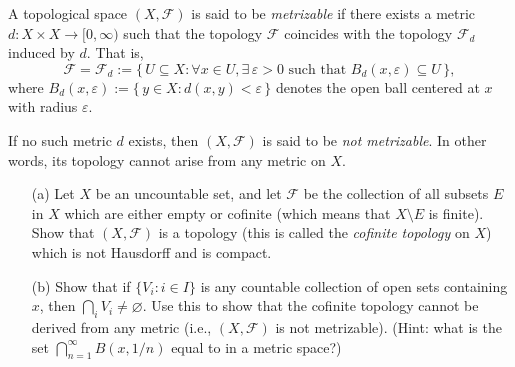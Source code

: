 \begin{problem}[15pts]
    \vphantom{text}
    \begin{definition}\label{def:metrizable}
A topological space $(X,\mathcal{F})$ is said to be \emph{metrizable} if there exists a metric $d : X \times X \to [0,\infty)$ such that the topology $\mathcal{F}$ coincides with the topology $\mathcal{F}_d$ induced by $d$.  
That is,
\[
\mathcal{F} = \mathcal{F}_d := \{\, U \subseteq X : \forall x \in U, \exists\, \varepsilon > 0 \text{ such that } B_d(x,\varepsilon) \subseteq U \,\},
\]
where $B_d(x,\varepsilon) := \{\, y \in X : d(x,y) < \varepsilon \,\}$ denotes the open ball centered at $x$ with radius $\varepsilon$.

\medskip
If no such metric $d$ exists, then $(X,\mathcal{F})$ is said to be \emph{not metrizable}.  
In other words, its topology cannot arise from any metric on $X$.
\end{definition}

\begin{enumerate}
\item[(a)]  Let $X$ be an uncountable set, and let $\mathcal{F}$ be the collection of all subsets $E$ in $X$ which are either empty or cofinite (which means that $X \setminus E$ is finite).  
Show that $(X, \mathcal{F})$ is a topology (this is called the \emph{cofinite topology} on $X$) which is not Hausdorff  and is compact.  

\item[(b)] 
Show that if $\{V_i : i \in I\}$ is any countable collection of open sets containing $x$, then $\bigcap_i V_i \neq \varnothing$.  
Use this to show that the cofinite topology cannot be derived from any metric (i.e., $(X, \mathcal{F})$ is not metrizable).  
(Hint: what is the set $\bigcap_{n=1}^\infty B(x, 1/n)$ equal to in a metric space?)

\end{enumerate}
\end{problem}

